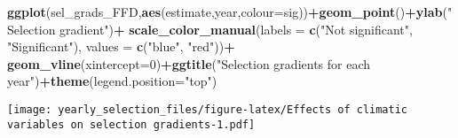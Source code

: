 \documentclass[]{article}
\newenvironment{Shaded}{\begin{snugshade}}{\end{snugshade}}
\newcommand{\KeywordTok}[1]{\textcolor[rgb]{0.13,0.29,0.53}{\textbf{#1}}}
\newcommand{\DataTypeTok}[1]{\textcolor[rgb]{0.13,0.29,0.53}{#1}}
\newcommand{\DecValTok}[1]{\textcolor[rgb]{0.00,0.00,0.81}{#1}}
\newcommand{\StringTok}[1]{\textcolor[rgb]{0.31,0.60,0.02}{#1}}
\newcommand{\OperatorTok}[1]{\textcolor[rgb]{0.81,0.36,0.00}{\textbf{#1}}}
\newcommand{\NormalTok}[1]{#1}
\begin{document}
\begin{Shaded}
\begin{Highlighting}[]
\KeywordTok{ggplot}\NormalTok{(sel_grads_FFD,}\KeywordTok{aes}\NormalTok{(estimate,year,}\DataTypeTok{colour=}\NormalTok{sig))}\OperatorTok{+}\KeywordTok{geom_point}\NormalTok{()}\OperatorTok{+}\KeywordTok{ylab}\NormalTok{(}\StringTok{"Selection gradient"}\NormalTok{)}\OperatorTok{+}
\StringTok{  }\KeywordTok{scale_color_manual}\NormalTok{(}\DataTypeTok{labels =} \KeywordTok{c}\NormalTok{(}\StringTok{"Not significant"}\NormalTok{, }\StringTok{"Significant"}\NormalTok{), }\DataTypeTok{values =} \KeywordTok{c}\NormalTok{(}\StringTok{"blue"}\NormalTok{, }\StringTok{"red"}\NormalTok{))}\OperatorTok{+}
\StringTok{  }\KeywordTok{geom_vline}\NormalTok{(}\DataTypeTok{xintercept=}\DecValTok{0}\NormalTok{)}\OperatorTok{+}\KeywordTok{ggtitle}\NormalTok{(}\StringTok{"Selection gradients for each year"}\NormalTok{)}\OperatorTok{+}\KeywordTok{theme}\NormalTok{(}\DataTypeTok{legend.position=}\StringTok{"top"}\NormalTok{)}
\end{Highlighting}
\end{Shaded}

\texttt{[image: yearly\_selection\_files/figure-latex/Effects of climatic variables on selection gradients-1.pdf]}
\end{document}
